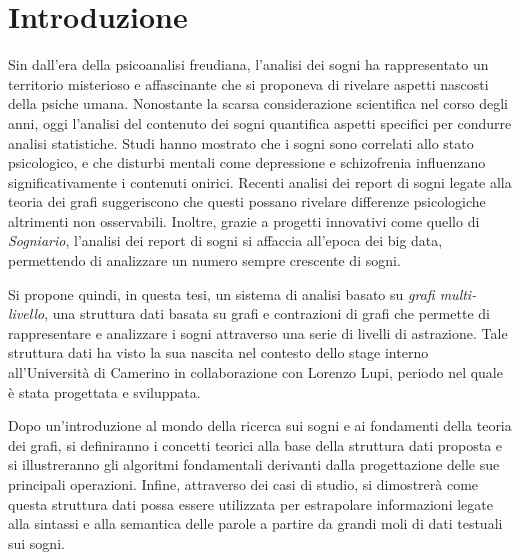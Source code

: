\chapter*{Introduzione}

Sin dall'era della psicoanalisi freudiana, l'analisi dei sogni ha rappresentato un territorio misterioso
e affascinante che si proponeva di rivelare aspetti nascosti della psiche umana.
Nonostante la scarsa considerazione scientifica nel corso degli anni, oggi l'analisi del contenuto dei sogni
quantifica aspetti specifici per condurre analisi statistiche.
Studi hanno mostrato che i sogni sono correlati allo stato psicologico, e che disturbi mentali come depressione e
schizofrenia influenzano significativamente i contenuti onirici.
Recenti analisi dei report di sogni legate alla teoria dei grafi suggeriscono che questi possano rivelare differenze
psicologiche altrimenti non osservabili.
Inoltre, grazie a progetti innovativi come quello di \textit{Sogniario}, l'analisi dei report di sogni si affaccia
all'epoca dei big data, permettendo di analizzare un numero sempre crescente di sogni.

Si propone quindi, in questa tesi, un sistema di analisi basato su \textit{grafi multi-livello},
una struttura dati basata su grafi e contrazioni di grafi che permette di rappresentare e analizzare i sogni attraverso
una serie di livelli di astrazione.
Tale struttura dati ha visto la sua nascita nel contesto dello stage interno all'Università di Camerino
in collaborazione con Lorenzo Lupi, periodo nel quale è stata progettata e sviluppata.

Dopo un'introduzione al mondo della ricerca sui sogni e ai fondamenti della teoria dei grafi,
si definiranno i concetti teorici alla base della struttura dati proposta e si illustreranno gli algoritmi fondamentali
derivanti dalla progettazione delle sue principali operazioni.
Infine, attraverso dei casi di studio, si dimostrerà come questa struttura dati possa essere utilizzata per
estrapolare informazioni legate alla sintassi e alla semantica delle parole a partire da
grandi moli di dati testuali sui sogni.